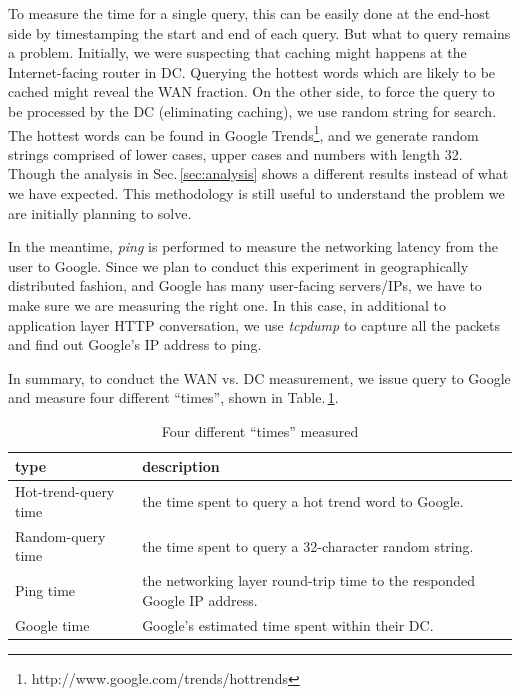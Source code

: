 To measure the time for a single query, this can be easily done at the end-host side by timestamping the start and end of each query. But what to query remains a problem. Initially, we were suspecting that caching might happens at the Internet-facing router in DC. Querying the hottest words which are likely to be cached might reveal the WAN fraction. On the other side, to force the query to be processed by the DC (eliminating caching), we use random string for search. The hottest words can be found in Google Trends\footnote{http://www.google.com/trends/hottrends}, and we generate random strings comprised of lower cases, upper cases and numbers with length 32. Though the analysis in Sec.\,\ref{sec:analysis} shows a different results instead of what we have expected. This methodology is still useful to understand the problem we are initially planning to solve. 

In the meantime, {\it ping} is performed to measure the networking latency from the user to Google. Since we plan to conduct this experiment in geographically distributed fashion, and Google has many user-facing servers/IPs, we have to make sure we are measuring the right one. In this case, in additional to application layer HTTP conversation, we use {\it tcpdump} to capture all the packets and find out Google's IP address to ping.
 
In summary, to conduct the WAN vs. DC measurement, we issue query to Google and measure four different ``times'', shown in Table.\,\ref{tab:DC_method}.

\begin{table}
  \begin{tabular}{p{2.8cm} | p{5cm}}
    \hline
    type & description \\
    \hline
    Hot-trend-query time & the time spent to query a hot trend word to Google. \\
    Random-query time & the time spent to query a 32-character random string.  \\
    Ping time & the networking layer round-trip time to the responded Google IP address. \\
    Google time & Google's estimated time spent within their DC. \\
    \hline
  \end{tabular}
  \caption{Four different ``times'' measured}
  \label{tab:DC_method}
\end{table}



